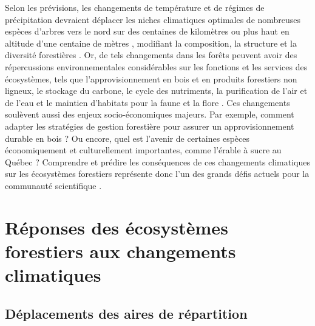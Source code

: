 Selon les prévisions, les changements de température et de régimes de
précipitation devraient déplacer les niches climatiques optimales de
nombreuses espèces d'arbres vers le nord sur des centaines de kilomètres
\citep{mckenney_potential_2007} ou plus haut en altitude d'une centaine
de mètres \citep{jump_altitude-for-latitude_2009}, modifiant la
composition, la structure et la diversité forestières
\citep{price_anticipating_2013, reich_geographic_2015}. Or, de tels
changements dans les forêts peuvent avoir des répercussions
environnementales considérables sur les fonctions et les services des
écosystèmes, tels que l'approvisionnement en bois et en produits
forestiers non ligneux, le stockage du carbone, le cycle des nutriments,
la purification de l'air et de l'eau et le maintien d'habitats pour la
faune et la flore \citep{mitchell_linking_2013, mori_biodiversity_2017}.
Ces changements soulèvent aussi des enjeux socio-économiques majeurs.
Par exemple, comment adapter les stratégies de gestion forestière pour
assurer un approvisionnement durable en bois ? Ou encore, quel est
l'avenir de certaines espèces économiquement et culturellement
importantes, comme l'érable à sucre au Québec ? Comprendre et prédire
les conséquences de ces changements climatiques sur les écosystèmes
forestiers représente donc l'un des grands défis actuels pour la
communauté scientifique
\citep{pereira_scenarios_2010, garcia_multiple_2014}.

\hypertarget{ruxe9ponses-des-uxe9cosystuxe8mes-forestiers-aux-changements-climatiques}{%
\section{Réponses des écosystèmes forestiers aux changements
climatiques}\label{ruxe9ponses-des-uxe9cosystuxe8mes-forestiers-aux-changements-climatiques}}

\hypertarget{duxe9placements-des-aires-de-ruxe9partition}{%
\subsection{Déplacements des aires de
répartition}\label{duxe9placements-des-aires-de-ruxe9partition}}

